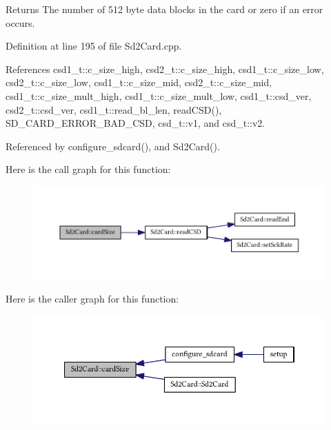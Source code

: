 \begin{DoxyReturn}{Returns}
The number of 512 byte data blocks in the card or zero if an error occurs. 
\end{DoxyReturn}


Definition at line 195 of file Sd2\+Card.\+cpp.



References csd1\+\_\+t\+::c\+\_\+size\+\_\+high, csd2\+\_\+t\+::c\+\_\+size\+\_\+high, csd1\+\_\+t\+::c\+\_\+size\+\_\+low, csd2\+\_\+t\+::c\+\_\+size\+\_\+low, csd1\+\_\+t\+::c\+\_\+size\+\_\+mid, csd2\+\_\+t\+::c\+\_\+size\+\_\+mid, csd1\+\_\+t\+::c\+\_\+size\+\_\+mult\+\_\+high, csd1\+\_\+t\+::c\+\_\+size\+\_\+mult\+\_\+low, csd1\+\_\+t\+::csd\+\_\+ver, csd2\+\_\+t\+::csd\+\_\+ver, csd1\+\_\+t\+::read\+\_\+bl\+\_\+len, read\+C\+S\+D(), S\+D\+\_\+\+C\+A\+R\+D\+\_\+\+E\+R\+R\+O\+R\+\_\+\+B\+A\+D\+\_\+\+C\+SD, csd\+\_\+t\+::v1, and csd\+\_\+t\+::v2.



Referenced by configure\+\_\+sdcard(), and Sd2\+Card().



Here is the call graph for this function\+:\nopagebreak
\begin{figure}[H]
\begin{center}
\leavevmode
\includegraphics[width=350pt]{class_sd2_card_a862473431cc314238bfccdc531a70d3a_cgraph}
\end{center}
\end{figure}




Here is the caller graph for this function\+:
\nopagebreak
\begin{figure}[H]
\begin{center}
\leavevmode
\includegraphics[width=350pt]{class_sd2_card_a862473431cc314238bfccdc531a70d3a_icgraph}
\end{center}
\end{figure}


